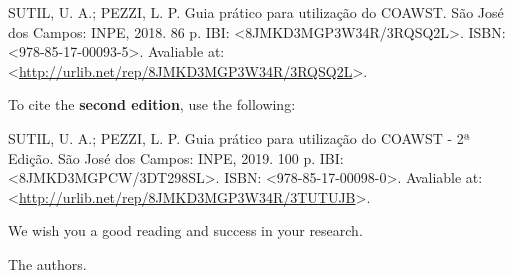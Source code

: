 \noindent SUTIL, U. A.; PEZZI, L. P. Guia prático para utilização do COAWST. São José dos Campos: INPE, 2018. 86 p. IBI: <8JMKD3MGP3W34R/3RQSQ2L>. ISBN: <978-85-17-00093-5>. Avaliable at: <\textcolor{bleu_cite}{\href{http://urlib.net/rep/8JMKD3MGP3W34R/3RQSQ2L}{http://urlib.net/rep/8JMKD3MGP3W34R/3RQSQ2L}}>. 
\bigskip

\noindent To cite the \textbf{second edition}, use the following:
\bigskip

\noindent SUTIL, U. A.; PEZZI, L. P. Guia prático para utilização do COAWST - 2ª Edição. São José dos Campos: INPE, 2019. 100 p. IBI: <8JMKD3MGPCW/3DT298SL>. ISBN: <978-85-17-00098-0>. Avaliable at: <\textcolor{bleu_cite}{\href{http://urlib.net/rep/8JMKD3MGP3W34R/3TUTUJB}{http://urlib.net/rep/8JMKD3MGP3W34R/3TUTUJB}}>. 

\bigskip
\bigskip

\noindent We wish you a good reading and success in your research.
\bigskip

\noindent The authors.

